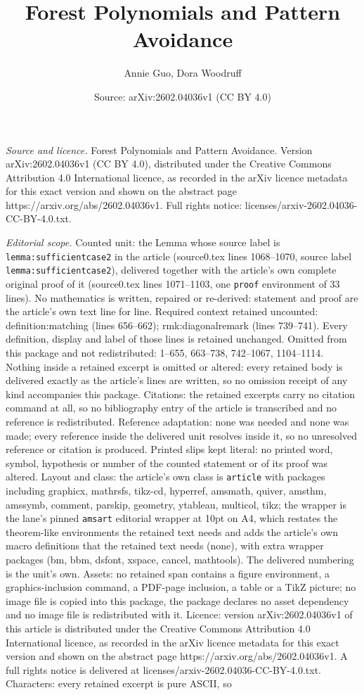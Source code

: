 \documentclass[10pt,a4paper]{amsart}
\title[Forest Polynomials and Pattern Avoidance]{Forest Polynomials and Pattern Avoidance}
\author{Annie Guo, Dora Woodruff}
\date{Source: arXiv:2602.04036v1 (CC BY 4.0)}
\begin{document}
\maketitle

\noindent\emph{Source and licence.} Forest Polynomials and Pattern Avoidance. Version arXiv:2602.04036v1 (CC BY 4.0), distributed under the Creative Commons Attribution 4.0 International licence, as recorded in the arXiv licence metadata for this exact version and shown on the abstract page https://arxiv.org/abs/2602.04036v1. Full rights notice: licenses/arxiv-2602.04036-CC-BY-4.0.txt.\par\smallskip

\noindent\textit{Editorial scope.} Counted unit: the Lemma whose source label is \texttt{lemma:sufficientcase2} in the article (source0.tex lines 1068--1070, source label \texttt{lemma:sufficientcase2}), delivered together with the article's own complete original proof of it (source0.tex lines 1071--1103, one \texttt{proof} environment of 33 lines). No mathematics is written, repaired or re-derived: statement and proof are the article's own text line for line. Required context retained uncounted: definition:matching (lines 656--662); rmk:diagonalremark (lines 739--741). Every definition, display and label of those lines is retained unchanged. Omitted from this package and not redistributed: 1--655, 663--738, 742--1067, 1104--1114. Nothing inside a retained excerpt is omitted or altered: every retained body is delivered exactly as the article's lines are written, so no omission receipt of any kind accompanies this package. Citations: the retained excerpts carry no citation command at all, so no bibliography entry of the article is transcribed and no reference is redistributed. Reference adaptation: none was needed and none was made; every reference inside the delivered unit resolves inside it, so no unresolved reference or citation is produced. Printed slips kept literal: no printed word, symbol, hypothesis or number of the counted statement or of its proof was altered. Layout and class: the article's own class is \texttt{article} with packages including graphicx, mathrsfs, tikz-cd, hyperref, amsmath, quiver, amsthm, amssymb, comment, parskip, geometry, ytableau, multicol, tikz; the wrapper is the lane's pinned \texttt{amsart} editorial wrapper at 10pt on A4, which restates the theorem-like environments the retained text needs and adds the article's own macro definitions that the retained text needs (none), with extra wrapper packages (bm, bbm, dsfont, xspace, cancel, mathtools). The delivered numbering is the unit's own. Assets: no retained span contains a figure environment, a graphics-inclusion command, a PDF-page inclusion, a table or a TikZ picture; no image file is copied into this package, the package declares no asset dependency and no image file is redistributed with it. Licence: version arXiv:2602.04036v1 of this article is distributed under the Creative Commons Attribution 4.0 International licence, as recorded in the arXiv licence metadata for this exact version and shown on the abstract page https://arxiv.org/abs/2602.04036v1. A full rights notice is delivered at licenses/arxiv-2602.04036-CC-BY-4.0.txt. Characters: every retained excerpt is pure ASCII, so 
\end{document}

